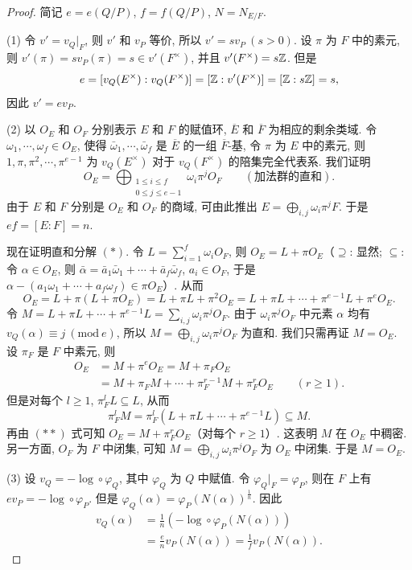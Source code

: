 \begin{proof}
简记 $e=e(Q/P)$, $f=f(Q/P)$, $N=N_{E/F}$.

(1) 令 $v'=v_Q|_F$, 则 $v'$ 和 $v_P$ 等价, 所以 $v'=sv_P\ (s>0)$. 设 $\pi$ 为 $F$ 中的素元, 则 $v'(\pi)=sv_P(\pi)=s\in v'(F^{\times})$, 并且 $v'(F^{\times})=s\mathbb{Z}$. 但是
\[
  e=[v_Q(E^{\times}):v_Q(F^{\times})]=[\mathbb{Z}:v'(F^{\times})]=[\mathbb{Z}:s\mathbb{Z}]=s,
\]
因此 $v'=ev_P$.

(2) 以 $O_E$ 和 $O_F$ 分别表示 $E$ 和 $F$ 的赋值环, $\overline{E}$ 和 $\overline{F}$ 为相应的剩余类域. 令 $\omega_1,\cdots,\omega_f\in O_E$, 使得 $\bar{\omega}_1,\cdots,\bar{\omega}_f$ 是 $\overline{E}$ 的一组 $\overline{F}$-基, 令 $\pi$ 为 $E$ 中的素元, 则 $1,\pi,\pi^2,\cdots,\pi^{e-1}$ 为 $v_Q(E^{\times})$ 对于 $v_Q(F^{\times})$ 的陪集完全代表系. 我们证明
\begin{equation}\tag{*}
  O_E=\bigoplus_{\substack{1\leqslant i\leqslant f\\ 0\leqslant j\leqslant e-1}}\omega_i\pi^jO_F\qquad(\text{加法群的直和}).
\end{equation}
由于 $E$ 和 $F$ 分别是 $O_E$ 和 $O_F$ 的商域, 可由此推出 $E=\bigoplus_{i,j}\omega_i\pi^jF$. 于是 $ef=[E:F]=n$.

现在证明直和分解 $(*)$. 令 $L=\sum_{i=1}^{f}\omega_iO_F$, 则 $O_E=L+\pi O_E$（$\supseteq$: 显然; $\subseteq$: 令 $\alpha\in O_E$, 则 $\bar{\alpha}=\bar{a}_1\bar{\omega}_1+\cdots+\bar{a}_f\bar{\omega}_f$, $a_i\in O_F$, 于是 $\alpha-(a_1\omega_1+\cdots+a_f\omega_f)\in\pi O_E$）. 从而
\[
  O_E=L+\pi(L+\pi O_E)=L+\pi L+\pi^2O_E
  =L+\pi L+\cdots+\pi^{e-1}L+\pi^eO_E.
\]
令 $M=L+\pi L+\cdots+\pi^{e-1}L=\sum_{i,j}\omega_i\pi^jO_F$. 由于 $\omega_i\pi^jO_F$ 中元素 $\alpha$ 均有 $v_Q(\alpha)\equiv j\ (\mathrm{mod}\ e)$, 所以 $M=\bigoplus_{i,j}\omega_i\pi^jO_F$ 为直和. 我们只需再证 $M=O_E$. 设 $\pi_F$ 是 $F$ 中素元, 则
\begin{align*}
  O_E&=M+\pi^eO_E=M+\pi_FO_E\\
  &=M+\pi_FM+\cdots+\pi_F^{r-1}M+\pi_F^rO_E\qquad(r\geqslant 1).\tag{**}
\end{align*}
但是对每个 $l\geqslant 1$, $\pi_F^lL\subseteq L$, 从而
\[
  \pi_F^lM=\pi_F^l(L+\pi L+\cdots+\pi^{e-1}L)\subseteq M.
\]
再由 $(**)$ 式可知 $O_E=M+\pi_F^rO_E$（对每个 $r\geqslant 1$）. 这表明 $M$ 在 $O_E$ 中稠密. 另一方面, $O_F$ 为 $F$ 中闭集, 可知 $M=\bigoplus_{i,j}\omega_i\pi^jO_F$ 为 $O_E$ 中闭集. 于是 $M=O_E$.

(3) 设 $v_Q=-\log\circ\varphi_Q$, 其中 $\varphi_Q$ 为 $Q$ 中赋值. 令 $\varphi_Q|_F=\varphi_P$, 则在 $F$ 上有 $ev_P=-\log\circ\varphi_P$. 但是 $\varphi_Q(\alpha)=\varphi_P(N(\alpha))^{\frac{1}{n}}$. 因此
\begin{align*}
  v_Q(\alpha)&=\frac{1}{n}\left(-\log\circ\varphi_P(N(\alpha))\right)\\
  &=\frac{e}{n}v_P(N(\alpha))=\frac{1}{f}v_P(N(\alpha)).
\end{align*}
\end{proof}

